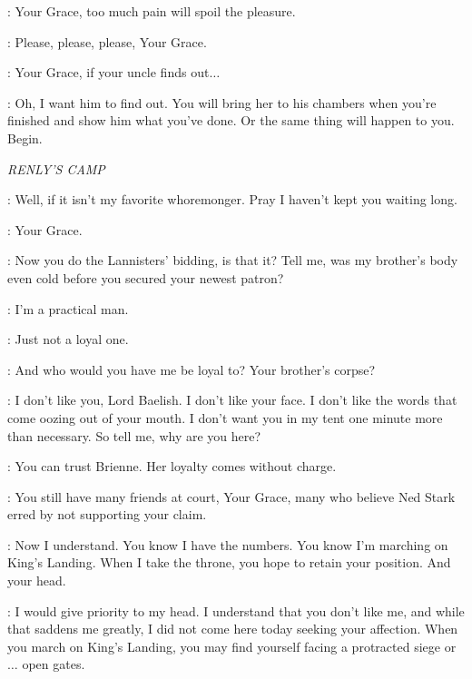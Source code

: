 
\ROS: Your Grace, too much pain will spoil the pleasure. 


\DAISY: Please, please, please, Your Grace. 

\ROS: Your Grace, if your uncle finds out$\ldots$  

\JOFFREY: Oh, I want him to find out. You will bring her to his chambers when you're finished and show him what you've done. Or the same thing will happen to you. Begin. 



\scene

\textit{RENLY'S CAMP} 


\RENLY: Well, if it isn't my favorite whoremonger. Pray I haven't kept you waiting long. 

\LITTLEFINGER: Your Grace. 

\RENLY: Now you do the Lannisters' bidding, is that it? Tell me, was my brother's body even cold before you secured your newest patron? 

\LITTLEFINGER: I'm a practical man. 

\RENLY: Just not a loyal one. 

\LITTLEFINGER: And who would you have me be loyal to? Your brother's corpse? 

\RENLY: I don't like you, Lord Baelish. I don't like your face. I don't like the words that come oozing out of your mouth. I don't want you in my tent one minute more than necessary. So tell me, why are you here? 


\RENLY: You can trust Brienne. Her loyalty comes without charge. 

\LITTLEFINGER: You still have many friends at court, Your Grace, many who believe Ned Stark erred by not supporting your claim. 

\RENLY: Now I understand. You know I have the numbers. You know I'm marching on King's Landing. When I take the throne, you hope to retain your position. And your head. 

\LITTLEFINGER: I would give priority to my head. I understand that you don't like me, and while that saddens me greatly, I did not come here today seeking your affection. When you march on King's Landing, you may find yourself facing a protracted siege or$\ldots$ open gates. 


